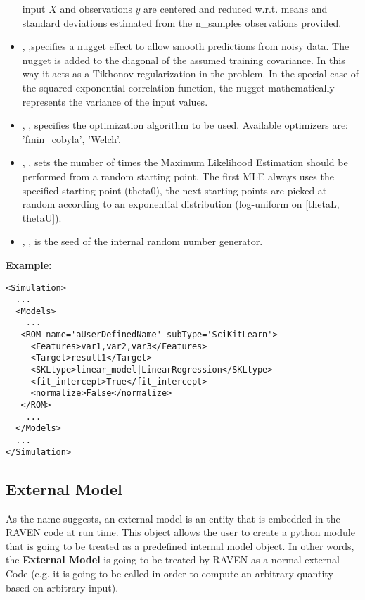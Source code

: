 \begin{itemize}
  input $X$ and observations $y$ are centered and reduced w.r.t. means and
  standard deviations estimated from the n\_samples observations provided.
  \item {}, ,specifies a nugget
  effect to allow smooth predictions from noisy data.
  The nugget is added to the diagonal of the assumed training covariance.
  In this way it acts as a Tikhonov regularization in the problem.
  In the special case of the squared exponential correlation function, the
  nugget mathematically represents the variance of the input values.
  \item {}, , specifies the
  optimization algorithm to be used.
  Available optimizers are: 'fmin\_cobyla', 'Welch'.
  \item {}, , sets the
  number of times the Maximum Likelihood Estimation should be performed from
  a random starting point.
  The first MLE always uses the specified starting point (theta0), the next
  starting points are picked at random according to an exponential distribution
  (log-uniform on [thetaL, thetaU]).
  \item {}, , is the seed
  of the internal random number generator.
\end{itemize}

\textbf{Example:}
\begin{lstlisting}[style=XML,morekeywords={name,subType}]
<Simulation>
  ...
  <Models>
    ...
   <ROM name='aUserDefinedName' subType='SciKitLearn'>
     <Features>var1,var2,var3</Features>
     <Target>result1</Target>
     <SKLtype>linear_model|LinearRegression</SKLtype>
     <fit_intercept>True</fit_intercept>
     <normalize>False</normalize>
   </ROM>
    ...
  </Models>
  ...
</Simulation>
\end{lstlisting}

\subsection{External Model}
\label{subsec:models_externalModel}
As the name suggests, an external model is an entity that is embedded in the
RAVEN code at run time.
%
This object allows the user to create a python module that is going to be
treated as a predefined internal model object.
%
In other words, the \textbf{External Model} is going to be treated by RAVEN as a
normal external Code (e.g. it is going to be called in order to compute an
arbitrary quantity based on arbitrary input).
%

